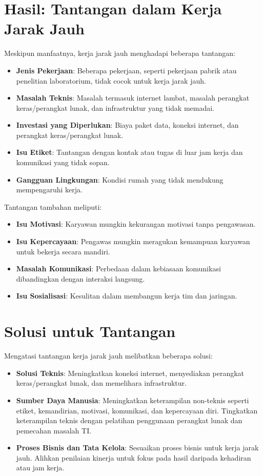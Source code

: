 \section{Hasil: Tantangan dalam Kerja Jarak Jauh}

Meskipun manfaatnya, kerja jarak jauh menghadapi beberapa tantangan:
\begin{itemize}
	\item \textbf{Jenis Pekerjaan}: Beberapa pekerjaan, seperti pekerjaan pabrik atau penelitian laboratorium, tidak cocok untuk kerja jarak jauh.
	\item \textbf{Masalah Teknis}: Masalah termasuk internet lambat, masalah perangkat keras/perangkat lunak, dan infrastruktur yang tidak memadai.
	\item \textbf{Investasi yang Diperlukan}: Biaya paket data, koneksi internet, dan perangkat keras/perangkat lunak.
	\item \textbf{Isu Etiket}: Tantangan dengan kontak atau tugas di luar jam kerja dan komunikasi yang tidak sopan.
	\item \textbf{Gangguan Lingkungan}: Kondisi rumah yang tidak mendukung mempengaruhi kerja.
\end{itemize}

Tantangan tambahan meliputi:
\begin{itemize}
	\item \textbf{Isu Motivasi}: Karyawan mungkin kekurangan motivasi tanpa pengawasan.
	\item \textbf{Isu Kepercayaan}: Pengawas mungkin meragukan kemampuan karyawan untuk bekerja secara mandiri.
	\item \textbf{Masalah Komunikasi}: Perbedaan dalam kebiasaan komunikasi dibandingkan dengan interaksi langsung.
	\item \textbf{Isu Sosialisasi}: Kesulitan dalam membangun kerja tim dan jaringan.
\end{itemize}

\section{Solusi untuk Tantangan}

Mengatasi tantangan kerja jarak jauh melibatkan beberapa solusi:
\begin{itemize}
	\item \textbf{Solusi Teknis}: Meningkatkan koneksi internet, menyediakan perangkat keras/perangkat lunak, dan memelihara infrastruktur.
	\item \textbf{Sumber Daya Manusia}: Meningkatkan keterampilan non-teknis seperti etiket, kemandirian, motivasi, komunikasi, dan kepercayaan diri. Tingkatkan keterampilan teknis dengan pelatihan penggunaan perangkat lunak dan pemecahan masalah TI.
	\item \textbf{Proses Bisnis dan Tata Kelola}: Sesuaikan proses bisnis untuk kerja jarak jauh. Alihkan penilaian kinerja untuk fokus pada hasil daripada kehadiran atau jam kerja.
\end{itemize}

